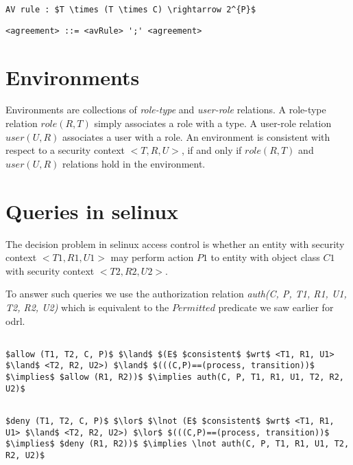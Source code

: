 \lstset{language=AST}
\begin{lstlisting}[frame=single, caption={'allow'/'deny' Rule as a Mapping},label={lst:allowmappingastselinux}]
AV rule : $T \times (T \times C) \rightarrow 2^{P}$
\end{lstlisting}

\lstset{language=AST}
\begin{lstlisting}[frame=single, caption={\ac{selinux} Agreement},label={lst:agreementastselinux}]
<agreement> ::= <avRule> ';' <agreement> 
\end{lstlisting}


\section{Environments}

Environments are collections of \emph{role-type} and \emph{user-role} relations. A role-type relation $role(R, T)$ simply associates a role with a type. A user-role relation $user(U, R)$ associates a user with a role. An environment is consistent with respect to a security context $<T, R, U>$, if and only if $role(R, T)$ and $user(U, R)$ relations hold in the environment. 

\section{Queries in \ac{selinux}}

The decision problem in \ac{selinux} access control is whether an entity with security context $<T1, R1, U1>$ may perform action $P1$ to entity with object class $C1$ with security context $<T2, R2, U2>$.

To answer such queries we use the authorization relation \emph{auth(C, P, T1, R1, U1, T2, R2, U2)} which is equivalent to the $Permitted$ predicate we saw earlier for \ac{odrl}.

\lstset{mathescape, language=AST} 
\begin{lstlisting}[frame=single, caption={$f^{+}_q$ for \ac{selinux}},label={lst:fqplussel}]

$allow (T1, T2, C, P)$ $\land$ $(E$ $consistent$ $wrt$ <T1, R1, U1> $\land$ <T2, R2, U2>) $\land$ $(((C,P)==(process, transition))$ $\implies$ $allow (R1, R2))$ $\implies auth(C, P, T1, R1, U1, T2, R2, U2)$ 

\end{lstlisting}

\lstset{mathescape, language=AST} 
\begin{lstlisting}[frame=single, caption={$f^{-}_q$ for \ac{selinux}},label={lst:fqminussel}]

$deny (T1, T2, C, P)$ $\lor$ $\lnot (E$ $consistent$ $wrt$ <T1, R1, U1> $\land$ <T2, R2, U2>) $\lor$ $(((C,P)==(process, transition))$ $\implies$ $deny (R1, R2))$ $\implies \lnot auth(C, P, T1, R1, U1, T2, R2, U2)$ 

\end{lstlisting}

